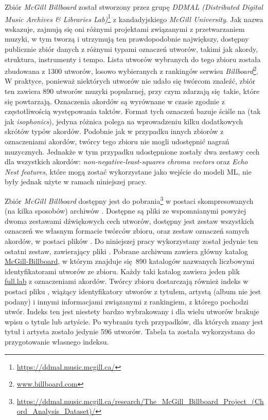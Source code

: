Zbiór \emph{McGill Billboard} \cite{burgoyne_expert_2011} został stworzony przez grupę \emph{DDMAL (Distributed Digital Music Archives \& Libraries Lab)}\footnote{\url{https://ddmal.music.mcgill.ca/}} z kandadyjskiego \emph{McGill University}. Jak nazwa wskazuje, zajmują się oni różnymi projektami związanymi z przetwarzaniem muzyki, w tym tworzą i utrzymują ten prawdopodobnie największy, dostępny publicznie zbiór danych z różnymi typami oznaczeń utworów, takimi jak akordy, struktura, instrumenty i tempo. Lista utworów wybranych do tego zbioru została zbudowana z 1300 utworów, losowo wybieranych z rankingów serwisu \emph{Billboard}\footnote{\url{www.billboard.com}}. W praktyce, ponieważ niektórych utworów nie udało się twórcom znaleźć, zbiór ten zawiera 890 utworów muzyki popularnej, przy czym zdarzają się takie, które się powtarzają. Oznaczenia akordów są wyrównane w czasie zgodnie z częstotliwością występowania taktów. Format tych oznaczeń bazuje ściśle na \cite{harte_towards_nodate} (tak jak \emph{isophonics}), jedyna różnica polega na wprowadzeniu kilku dodatkowych skrótów typów akordów.  Podobnie jak w przypadku innych zbiorów z oznaczeniami akordów, twórcy tego zbioru nie mogli udostępnić nagrań muzycznych. Jednakże w tym przypadku udostępnione zostały dwa zestawy cech dla wszystkich akordów: \emph{non-negative-least-squares chroma vectors} oraz \emph{Echo Nest features}, które mogą zostać wykorzystane jako wejście do modeli ML, nie były jednak użyte w ramach niniejszej pracy.

Zbiór \emph{McGill Billboard} dostępny jest do pobrania\footnote{\url{https://ddmal.music.mcgill.ca/research/The_McGill_Billboard_Project_(Chord_Analysis_Dataset)/}} w postaci skompresowanych (na kilka sposobów) archiwów . Dostępne są pliki ze wspomnianymi powyżej dwoma zestawami dźwiękowych cech utworów, dostępny jest zestaw wszystkich oznaczeń we własnym formacie twórców zbioru, oraz zestaw oznaczeń samych akordów, w postaci plików .  Do niniejszej pracy wykorzystany został jedynie ten ostatni zestaw, zawierający pliki . Pobrane archiwum zawiera główny katalog \url{McGill-Billboard}, w którym znajduje się 890 katalogów nazwanych liczbowymi identyfikatorami utworów ze zbioru. Każdy taki katalog zawiera jeden plik \url{full.lab} z oznaczeniami akordów. Twórcy zbioru dostarczają również indeks w postaci pliku , wiążący identyfikatory utworów z tytułem, artystą (album nie jest podany) i innymi informacjami związanymi z rankingiem, z którego pochodzi utwór. Indeks ten jest niestety bardzo wybrakowany i dla wielu utworów brakuje wpisu o tytule lub artyście. Po wybraniu tych przypadków, dla których znany jest tytuł i artysta zostało jedynie 596 utworów. Tabela ta została wykorzystana do przygotowanie własnego indeksu.

